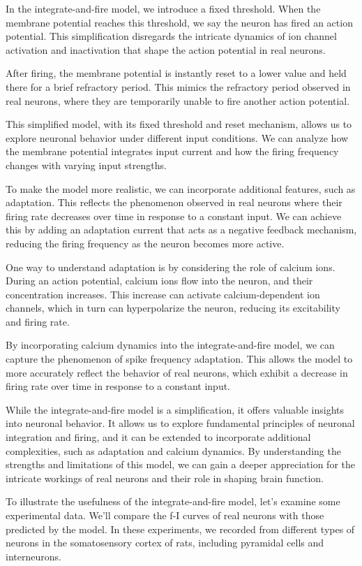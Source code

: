 In the integrate-and-fire model, we introduce a fixed threshold. When the membrane potential reaches this threshold, we say the neuron has fired an action potential. This simplification disregards the intricate dynamics of ion channel activation and inactivation that shape the action potential in real neurons.

After firing, the membrane potential is instantly reset to a lower value and held there for a brief refractory period. This mimics the refractory period observed in real neurons, where they are temporarily unable to fire another action potential.

This simplified model, with its fixed threshold and reset mechanism, allows us to explore neuronal behavior under different input conditions. We can analyze how the membrane potential integrates input current and how the firing frequency changes with varying input strengths.

To make the model more realistic, we can incorporate additional features, such as adaptation. This reflects the phenomenon observed in real neurons where their firing rate decreases over time in response to a constant input. We can achieve this by adding an adaptation current that acts as a negative feedback mechanism, reducing the firing frequency as the neuron becomes more active.

One way to understand adaptation is by considering the role of calcium ions. During an action potential, calcium ions flow into the neuron, and their concentration increases. This increase can activate calcium-dependent ion channels, which in turn can hyperpolarize the neuron, reducing its excitability and firing rate.

By incorporating calcium dynamics into the integrate-and-fire model, we can capture the phenomenon of spike frequency adaptation. This allows the model to more accurately reflect the behavior of real neurons, which exhibit a decrease in firing rate over time in response to a constant input.

While the integrate-and-fire model is a simplification, it offers valuable insights into neuronal behavior. It allows us to explore fundamental principles of neuronal integration and firing, and it can be extended to incorporate additional complexities, such as adaptation and calcium dynamics. By understanding the strengths and limitations of this model, we can gain a deeper appreciation for the intricate workings of real neurons and their role in shaping brain function.

To illustrate the usefulness of the integrate-and-fire model, let's examine some experimental data. We'll compare the f-I curves of real neurons with those predicted by the model. In these experiments, we recorded from different types of neurons in the somatosensory cortex of rats, including pyramidal cells and interneurons.

